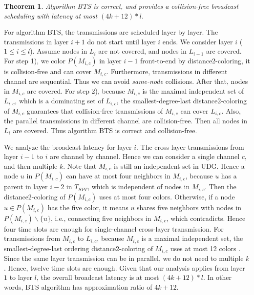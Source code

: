 \documentclass[10pt, conference]{IEEEtran}
\newtheorem{theorem}{Theorem}
\begin{document}
\begin{theorem} \label{BTS}
Algorithm BTS is correct, and provides a collision-free
broadcast scheduling with latency at most $(4k+12)*l$.
\end{theorem}
\begin{IEEEproof}
For algorithm BTS, the transmissions are scheduled layer by
layer. The transmissions in layer $i+1$ do not start until
layer $i$ ends. We consider layer $i$ ($1 \leq i \leq l$).
Assume nodes in $L_i$ are not covered, and nodes in $L_{i-1}$
are covered.  For step 1), we color $P(M_{i,c})$ in layer $i-1$
front-to-end by distance2-coloring, it is collision-free and
can cover $M_{i,c}$. Furthermore, transmissions in different
channel are sequential. Thus we can avoid \emph{same-node}
collisions. After that, nodes in $M_{i,c}$ are covered. For
step 2), because $M_{i,c}$ is the maximal independent set of
$L_{i,c}$, which is a dominating set of $L_{i,c}$, the
smallest-degree-last distance2-coloring of $M_{i,c}$ guarantees
that collision-free transmissions of $M_{i,c}$ can cover
$L_{i,c}$. Also, the parallel transmissions in different
channel are collision-free. Then all nodes in $L_i$ are
covered. Thus algorithm BTS is correct and collision-free.




We analyze the broadcast latency for layer $i$.
The cross-layer transmissions from layer $i-1$ to $i$ are channel by channel. Hence we
can consider a single channel $c$, and then multiple $k$. Note that
$M_{i,c}$ is still an independent set in UDG. Hence a node $u$ in
$P(M_{i,c})$ can have at most four neighbors in $M_{i,c}$,
because $u$ has a parent in layer $i-2$ in $T_{SPT}$, which is independent of nodes in $M_{i,c}$.
Then the distance2-coloring of $P(M_{i,c})$ uses at most four
colors. Otherwise, if a node $u \in P(M_{i, c})$ has the five
color, it means $u$ shares five neighbors with nodes in
$P(M_{i, c}) \backslash \{u\}$, i.e., connecting five neighbors
in $M_{i, c}$, which contradicts. Hence four time slots are
enough for single-channel cross-layer transmission. For
transmissions from $M_{i, c}$ to $L_{i,c}$, because $M_{i,c}$
is a maximal independent set, the smallest-degree-last ordering
distance2-coloring of $M_{i,c}$ uses at most 12 colors
\cite{info07, smallest-degree}. Since the same layer
transmission can be in parallel, we do not need to multiple
$k$. Hence, twelve time slots are enough. Given that our
analysis applies from layer $1$ to layer $l$, the overall
broadcast latency is at most $(4k+12)*l$. In other words, BTS
algorithm has approximation ratio of $4k+12$.
\end{IEEEproof}
\end{document}

